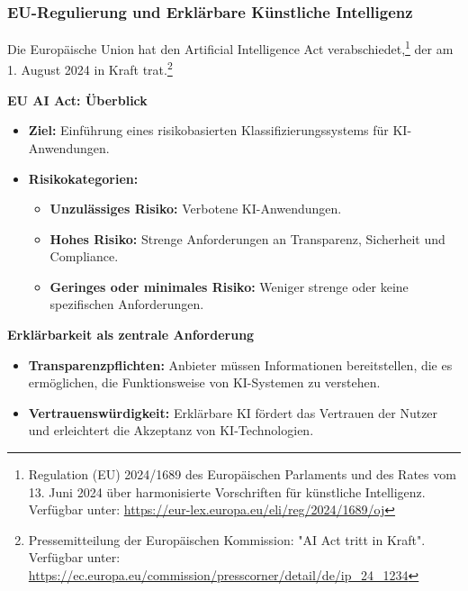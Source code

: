 \documentclass[aspectratio=1610, xcolor=dvipsnames, 9pt]{beamer}
\begin{document}
\begin{frame}
    \frametitle{EU-Regulierung und Erklärbare Künstliche Intelligenz}
Die Europäische Union hat den Artificial Intelligence Act verabschiedet,\footnote{Regulation (EU) 2024/1689 des Europäischen Parlaments und des Rates vom 13. Juni 2024 über harmonisierte Vorschriften für künstliche Intelligenz. Verfügbar unter: \url{https://eur-lex.europa.eu/eli/reg/2024/1689/oj}} der am 1. August 2024 in Kraft trat.\footnote{Pressemitteilung der Europäischen Kommission: "AI Act tritt in Kraft". Verfügbar unter: \url{https://ec.europa.eu/commission/presscorner/detail/de/ip_24_1234}}

    \textbf{EU AI Act: Überblick}
    \begin{itemize}
        \item \textbf{Ziel:} Einführung eines risikobasierten Klassifizierungssystems für KI-Anwendungen.  \newline
        \item \textbf{Risikokategorien:}
        \begin{itemize}
            \item \textbf{Unzulässiges Risiko:} Verbotene KI-Anwendungen.
            \item \textbf{Hohes Risiko:} Strenge Anforderungen an Transparenz, Sicherheit und Compliance.
            \item \textbf{Geringes oder minimales Risiko:} Weniger strenge oder keine spezifischen Anforderungen.
        \end{itemize}
    \end{itemize}

    \textbf{Erklärbarkeit als zentrale Anforderung} \newline
    \begin{itemize}
        \item \textbf{Transparenzpflichten:} Anbieter müssen Informationen bereitstellen, die es ermöglichen, die Funktionsweise von KI-Systemen zu verstehen.
        \item \textbf{Vertrauenswürdigkeit:} Erklärbare KI fördert das Vertrauen der Nutzer und erleichtert die Akzeptanz von KI-Technologien.
    \end{itemize}

\end{frame}
\end{document}
